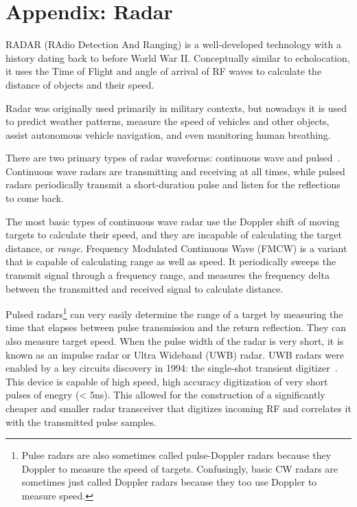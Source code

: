 \documentclass[12pt]{article}
\begin{document}

\begin{footnotesize}
  
\end{footnotesize}

\section*{Appendix: Radar}
RADAR (RAdio Detection And Ranging) is a well-developed technology
with a history dating back to before World War II. Conceptually
similar to echolocation, it uses the Time of Flight and angle of
arrival of RF waves to calculate the distance of objects and their
speed.

Radar was originally used primarily in military contexts, but nowadays
it is used to predict weather patterns, measure the speed of vehicles
and other objects, assist autonomous vehicle navigation, and even
monitoring human breathing.

There are two primary types of radar waveforms: continuous wave and
pulsed~\cite{Richards2010}. Continuous wave radars are transmitting
and receiving at all times, while pulsed radars periodically transmit a
short-duration pulse and listen for the reflections to come back.

The most basic types of continuous wave radar use the Doppler shift of
moving targets to calculate their speed, and they are incapable of
calculating the target distance, or \emph{range}. Frequency Modulated
Continuous Wave (FMCW) is a variant that is capable of calculating
range as well as speed. It periodically sweeps the transmit signal
through a frequency range, and measures the frequency delta between
the transmitted and received signal to calculate distance.

Pulsed radars\footnote{Pulse radars are also sometimes called
  pulse-Doppler radars because they Doppler to measure the speed of
  targets. Confusingly, basic CW radars are sometimes just called
  Doppler radars because they too use Doppler to measure speed.} can
very easily determine the range of a target by measuring the time that
elapses between pulse transmission and the return reflection. They can
also measure target speed. When the pulse width of the radar is very
short, it is known as an impulse radar or Ultra Wideband (UWB)
radar. UWB radars were enabled by a key circuits discovery in 1994:
the single-shot transient digitizer~\cite{}. This device is capable of
high speed, high accuracy digitization of very short pulses of enegry
(< 5ns). This allowed for the construction of a significantly cheaper
and smaller radar transceiver that digitizes incoming RF and
correlates it with the transmitted pulse samples. 
\end{document}
